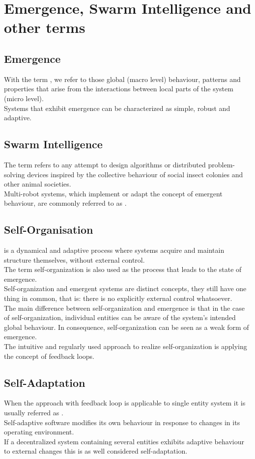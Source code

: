 \section{Emergence, Swarm Intelligence and other terms}
\subsection{Emergence}
With the term , we refer to those global (macro level) behaviour, patterns and properties that arise from the interactions between local parts of the system (micro level).\\
Systems that exhibit emergence can be characterized as simple, robust and adaptive.
\subsection{Swarm Intelligence}

The term  refers to any attempt to design algorithms or distributed problem-solving devices inspired by the collective behaviour of social insect colonies and other animal societies.\\
Multi-robot systems, which implement or adapt the concept of emergent behaviour, are commonly referred to as .
\subsection{Self-Organisation}
\phantom{c} is a dynamical and adaptive process where systems acquire and maintain structure themselves, without external control.\\
The term self-organization is also used as the process that leads to the state of emergence.\\
Self-organization and emergent systems are distinct concepts, they still have one thing in common, that is: there is no explicitly external control whatsoever.\\
The main difference between self-organization and emergence is that in the case of self-organization, individual entities can be aware of the system's intended global behaviour. In consequence, self-organization can be seen as a weak form of emergence.\\
The intuitive and regularly used approach to realize self-organization is applying the concept of feedback loops.

\subsection{Self-Adaptation}
When the approach with feedback loop is applicable to single entity system it is usually referred as .\\
Self-adaptive software modifies its own behaviour in response to changes in its operating environment.\\
If a decentralized system containing several entities exhibits adaptive behaviour to external changes this is as well considered self-adaptation.

